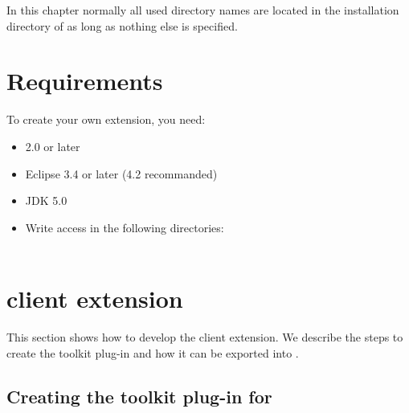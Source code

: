 In this chapter normally all used directory names are located in the
installation directory of \app{} as long as nothing else is specified.

\section{Requirements}
To create your own \app{} extension, you need:
\begin{itemize}
\item \app{} 2.0 or later
\item Eclipse 3.4 or later (4.2 recommanded)
\item JDK 5.0
\item Write access in the following directories:\\
\\
\end{itemize}

\section{\app{} client extension}
\label{clientExtension}

This section shows how to develop the \app{} client extension. We describe the
steps to create the toolkit plug-in and how it can be exported into \app{}.

\subsection{Creating the toolkit plug-in for \app{}}

